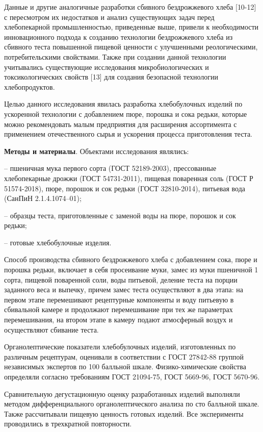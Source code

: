 Данные и другие аналогичные разработки сбивного бездрожжевого хлеба
{[}10-12{]} с пересмотром их недостатков и анализ существующих задач
перед хлебопекарной промышленностью, приведенные выше, привели к
необходимости инновационного подхода к созданию технологии бездрожжевого
хлеба из сбивного теста повышенной пищевой ценности с улучшенными
реологическими, потребительскими свойствами. Также при создании данной
технологии учитывались существующие исследования микробиологических и
токсикологических свойств {[}13{]} для создания безопасной технологии
хлебопродуктов.

Целью данного исследования явилась разработка хлебобулочных изделий по
ускоренной технологии с добавлением пюре, порошка и сока редьки, которые
можно рекомендовать малым предприятия для расширения ассортимента с
применением отечественного сырья и ускорения процесса приготовления
теста.

{\bfseries Методы и материалы}. Объектами исследования являлись:

-- пшеничная мука первого сорта (ГОСТ 52189-2003), прессованные
хлебопекарные дрожжи (ГОСТ 54731-2011), пищевая поваренная соль (ГОСТ Р
51574-2018), пюре, порошок и сок редьки (ГОСТ 32810-2014), питьевая вода
(СанПиН 2.1.4.1074--01);

-- образцы теста, приготовленные с заменой воды на пюре, порошок и сок
редьки;

-- готовые хлебобулочные изделия.

Способ производства сбивного бездрожжевого хлеба с добавлением сока,
пюре и порошка редьки, включает в себя просеивание муки, замес из муки
пшеничной 1 сорта, пищевой поваренной соли, воды питьевой, деление теста
на порции заданного веса и выпечку, причем замес теста осуществляют в
два этапа: на первом этапе перемешивают рецептурные компоненты и воду
питьевую в сбивальной камере и продолжают перемешивание при тех же
параметрах перемешивания, на втором этапе в камеру подают атмосферный
воздух и осуществляют сбивание теста.

Органолептические показатели хлебобулочных изделий, изготовленных по
различным рецептурам, оценивали в соответствии с ГОСТ 27842-88 группой
независимых экспертов по 100 балльной шкале. Физико-химические свойства
определяли согласно требованиям ГОСТ 21094-75, ГОСТ 5669-96, ГОСТ
5670-96.

Сравнительную дегустационную оценку разработанных изделий выполняли
методом дифференциального органолептического анализа по сто балльной
шкале. Также рассчитывали пищевую ценность готовых изделий. Все
эксперименты проводились в трехкратной повторности.

